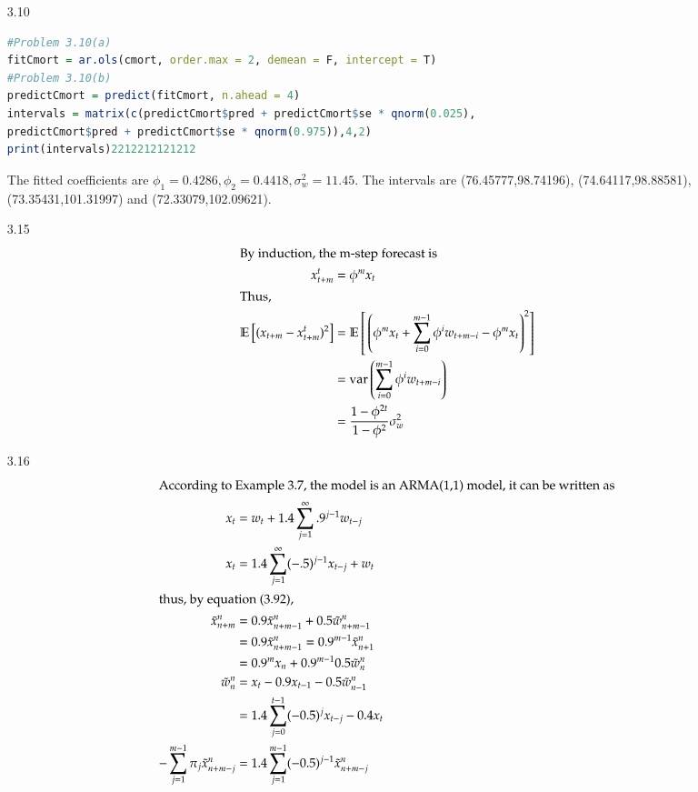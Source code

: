 \documentclass{article}
\newcommand{\ix}[1]{\intertext{{}#1}}
\newcommand{\var}{\mathrm{var}}
\newcommand{\mbe}[1]{\mathbb{E}\left[{}#1\right]}
\begin{document}
\begin{CJK*}{GBK}{song}
\begin{enumerate}
\item[3.10]
\begin{lstlisting}[language=R,keywordstyle=\color{blue!70},commentstyle=\color{red!50!green!50!blue!50},frame=single,rulesepcolor=\color{red!20!green!20!blue!20},backgroundcolor=\color{backcolour},
]
#Problem 3.10(a)
fitCmort = ar.ols(cmort, order.max = 2, demean = F, intercept = T)
#Problem 3.10(b)
predictCmort = predict(fitCmort, n.ahead = 4)
intervals = matrix(c(predictCmort$pred + predictCmort$se * qnorm(0.025),
predictCmort$pred + predictCmort$se * qnorm(0.975)),4,2)
print(intervals)2212212121212
\end{lstlisting}
The fitted coefficients are $\phi_1= 0.4286, \phi_2=0.4418, \sigma_w^2=11.45$. The intervals are (76.45777,98.74196), (74.64117,98.88581), (73.35431,101.31997) and (72.33079,102.09621).
\item[3.15]
\begin{align*}
	\ix{By induction, the m-step forecast is}
    x_{t+m}^t&=\phi^mx_t\\
    \ix{Thus,}
    \mbe{(x_{t+m}-x_{t+m}^t)^2}&=\mbe{\left(\phi^mx_t+\sum\limits_{i=0}^{m-1}\phi^iw_{t+m-i}-\phi^mx_t\right)^2}\\
    &={\var}\left(\sum\limits_{i=0}^{m-1}\phi^iw_{t+m-i}\right)\\
    &=\dfrac{1-\phi^{2t}}{1-\phi^2}\sigma_w^2
\end{align*}
\item[3.16]
\begin{align*}
	\ix{According to Example~3.7, the model is an ARMA(1,1) model, it can be written as}
    x_t&=w_t+1.4\sum\limits_{j=1}^\infty.9^{j-1}w_{t-j}\\
    x_t&=1.4\sum\limits_{j=1}^\infty(-.5)^{j-1}x_{t-j}+w_t\\
    \ix{thus, by equation~(3.92),}
    \tilde x_{n+m}^n&=0.9\tilde x_{n+m-1}^n+0.5\tilde w_{n+m-1}^n\\
    &=0.9\tilde x_{n+m-1}^n=0.9^{m-1}\tilde x_{n+1}^n\\
    &=0.9^{m}x_n+0.9^{m-1}0.5\tilde w_n^n\\
    \tilde w_n^n&=x_t-0.9x_{t-1}-0.5\tilde w_{n-1}^n\\
    &=1.4\sum\limits_{j=0}^{t-1}(-0.5)^{j}x_{t-j}-0.4x_t\\
    -\sum\limits_{j=1}^{m-1}\pi_j\tilde x_{n+m-j}^n&=1.4\sum\limits_{j=1}^{m-1}(-0.5)^{j-1}\tilde x_{n+m-j}^n\\

\end{align*}
\end{enumerate}
\end{CJK*}
\end{document}
